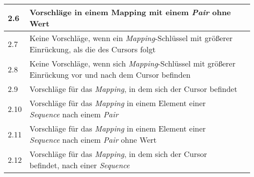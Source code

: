 \begin{table}[htp]
\begin{tabularx}{\columnwidth}{lXl}
        \midrule
        2.6                                                                   & Vorschläge in einem Mapping mit einem \textit{Pair} ohne Wert                                                                                                                                                     &   \\
        \midrule
        2.7                                                                   & Keine Vorschläge, wenn ein \textit{Mapping}-Schlüssel mit größerer Einrückung, als die des Cursors folgt                                                                                                          &   \\
        \midrule
        2.8                                                                   & Keine Vorschläge, wenn sich \textit{Mapping}-Schlüssel mit größerer Einrückung vor und nach dem Cursor befinden                                                                                                   &   \\
        \midrule
        2.9                                                                   & Vorschläge für das \textit{Mapping}, in dem sich der Cursor befindet                                                                                                                                              &   \\
        \midrule
        2.10                                                                  & Vorschläge für das \textit{Mapping} in einem Element einer \textit{Sequence} nach einem \textit{Pair}                                                                                                             &  \\
        \midrule
        2.11                                                                  & Vorschläge für das \textit{Mapping} in einem Element einer \textit{Sequence} nach einem \textit{Pair} ohne Wert                                                                                                   &  \\
        \midrule
        2.12                                                                  & Vorschläge für das \textit{Mapping}, in dem sich der Cursor befindet, nach einer \textit{Sequence}                                                                                                                &  \\

\end{tabularx}
\end{table}
